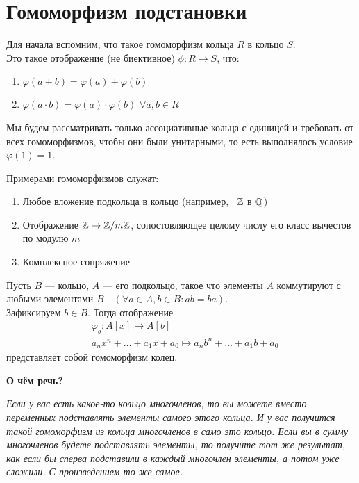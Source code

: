 
\section{Гомоморфизм подстановки}
\begin{normalsize}
    Для начала вспомним, что такое гомоморфизм кольца $R$ в кольцо $S$. \\
    Это такое отображение (не биективное) $\phi: R \rightarrow S$, что:
    \begin{enumerate}
        \item $\varphi(a + b) = \varphi(a) + \varphi(b)$
        \item $\varphi(a\cdot b) = \varphi(a) \cdot \varphi(b)$
        $\forall a,b \in R$
    \end{enumerate}
    Мы будем рассматривать только ассоциативные кольца с единицей и требовать
    от всех гомоморфизмов, чтобы они были унитарными, то есть выполнялось
    условие $\varphi(1) = 1$.
    
    Примерами гомоморфизмов служат:
    \begin{enumerate}
        \item Любое вложение подкольца в кольцо (например,  $\mathbb{Z}$ в $\mathbb{Q}$)
        \item Отображение $\mathbb{Z} \rightarrow \mathbb{Z} /m\mathbb{Z}$, сопостовляющее целому числу
        его класс вычестов по модулю $m$
        \item Комплексное сопряжение
    \end{enumerate}

    \begin{theorem-non}
        Пусть $B$ --- кольцо, $A$ --- его подкольцо, такое что элементы
        $A$ коммутируют с любыми элементами $B\quad (\forall a \in A, b \in B: ab = ba)$. \\
        Зафиксируем $b \in B$. Тогда отображение
        \begin{align*}
            &\varphi_b: A[x] \rightarrow A[b]\\
            &a_nx^n + \dots + a_1x + a_0 \mapsto a_nb^n + \dots + a_1b + a_0
        \end{align*}
        представляет собой гомоморфизм колец.
    \end{theorem-non}

    \textbf{О чём речь?}

    \emph{Если у вас есть какое-то кольцо многочленов, то вы можете вместо переменных
    подставлять элементы самого этого кольца. И у вас получится такой гомоморфизм из
    кольца многочленов в само это кольцо. Если вы в сумму многочленов будете подставлять элементы,
    то получите тот же результат, как если бы сперва подставили в каждый многочлен элементы,
    а потом уже сложили. С произведением то же самое.} \\
    

\end{normalsize}
